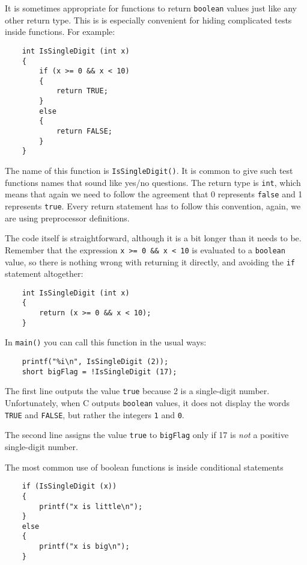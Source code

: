 It is sometimes appropriate for functions to return {\tt boolean} values just 
like any other return type. This is 
is especially convenient for hiding complicated tests inside
functions.  For example:

\begin{verbatim}
    int IsSingleDigit (int x)
    {
        if (x >= 0 && x < 10) 
        {
            return TRUE;
        } 
        else 
        {
            return FALSE;
        }
    }
\end{verbatim}
%
The name of this function is {\tt IsSingleDigit()}.  It is common
to give such test functions names that sound like yes/no questions.
The return type is {\tt int}, which means that again we need
to follow the agreement that  0 represents {\tt false} and 1 
represents {\tt true}. Every return
statement has to follow this convention, again, we are using
preprocessor definitions.

The code itself is straightforward, although it is a bit longer than
it needs to be.  Remember that the expression {\tt x >= 0 \&\& x < 10}
is evaluated to a {\tt boolean} value, so there is nothing wrong with returning it
directly, and avoiding the {\tt if} statement altogether:

\begin{verbatim}
    int IsSingleDigit (int x)
    {
        return (x >= 0 && x < 10);
    }
\end{verbatim}
%
In {\tt main()} you can call this function in the usual ways:

\begin{verbatim}
    printf("%i\n", IsSingleDigit (2));
    short bigFlag = !IsSingleDigit (17);
\end{verbatim}
%
The first line outputs the value {\tt true} because 2 is a
single-digit number.  Unfortunately, when C outputs {\tt boolean} values, it
does not display the words {\tt TRUE} and {\tt FALSE}, but rather the
integers {\tt 1} and {\tt 0}.

The second line assigns the value {\tt true} to {\tt bigFlag}
only if 17 is {\em not} a positive single-digit number.

The most common use of boolean functions is inside conditional
statements

\begin{verbatim}
    if (IsSingleDigit (x)) 
    {
        printf("x is little\n");
    } 
    else 
    {
        printf("x is big\n");
    }
\end{verbatim}

